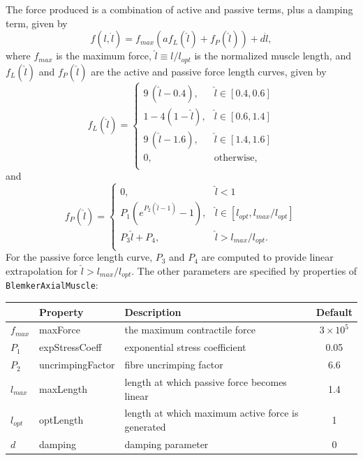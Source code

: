 The force produced is a combination of active and passive terms,
plus a damping term, given by
%
\begin{equation}
f(l, \dot l) = 
f_{max} \left( a f_L (\hat l) + f_P (\hat l) \right) + d \dot l,
\label{BlemkerAxialMaterial:eqn}
\end{equation}
%
where $f_{max}$ is the maximum force, $\hat l \equiv l/l_{opt}$ is the
normalized muscle length, and
$f_L (\hat l)$ and $f_P(\hat l)$ are the active and passive
force length curves, given by
%
\begin{equation}
f_L (\hat l) = 
\begin{cases}
9 \, (\hat l - 0.4), & \hat l \in [0.4, 0.6] \\
1 - 4 (1 - \hat l), & \hat l \in [0.6, 1.4] \\
9 \, (\hat l - 1.6), & \hat l \in [1.4, 1.6] \\
0, & \mathrm{otherwise}, \\
\end{cases}
\end{equation}
%
and
%
\begin{equation}
f_P (\hat l) = 
\begin{cases}
0, & \hat l < 1 \\
P_1 (e^{P_2 (\hat l-1)}-1), & \hat l \in [l_{opt}, l_{max}/l_{opt}]\\
P_3 \hat l + P_4, & \hat l > l_{max}/l_{opt}. \\
\end{cases}
\label{BlemkerPassive:eqn}
\end{equation}
%
For the passive force length curve, $P_3$ and $P_4$ are computed to
provide linear extrapolation for $\hat l > l_{max}/l_{opt}$. The other
parameters are specified by properties of {\tt BlemkerAxialMuscle}:

\begin{center}
\begin{tabular}{|l|l|l|c|} 
\hline
 & Property & Description & Default\\
\hline
$f_{max}$ & {\sf maxForce} & the maximum contractile force & $3 \times 10^5$ \\
$P_1$ & {\sf expStressCoeff} & exponential stress coefficient & 0.05 \\
$P_2$ & {\sf uncrimpingFactor} & fibre uncrimping factor & 6.6 \\
$l_{max}$ & {\sf maxLength} & 
length at which passive force becomes linear & 1.4 \\
$l_{opt}$ & {\sf optLength} & 
length at which maximum active force is generated & 1 \\
$d$ & {\sf damping} & damping parameter & 0 \\ 
\hline
\end{tabular}
\end{center}

